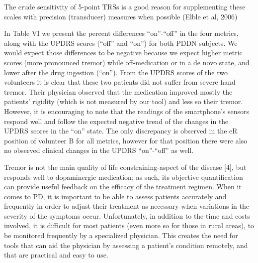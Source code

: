
The crude sensitivity of 5-point TRSs is a good reason for supplementing these scales with precision (transducer) measures when possible (Elble et al, 2006)



In Table VI we present the percent differences “on”-“off” in the four metrics, along with the UPDRS scores (“off” and “on”) for both PDDN subjects. We would expect those differences to be negative because we expect higher metric scores (more pronounced tremor) while off-medication or in a de novo state, and lower after the drug ingestion (“on”). 
From the UPDRS scores of the two volunteers it is clear that these two patients did not suffer from severe hand tremor. Their physician observed that the medication improved mostly the patients’ rigidity (which is not measured by our tool) and less so their tremor. However, it is encouraging to note that the readings of the smartphone’s sensors respond well and follow the expected negative trend of the changes in the UPDRS scores in the “on” state. The only discrepancy is observed in the eR position of volunteer B for all metrics, however for that position there were also no observed clinical changes in the UPDRS “on”-“off” as well. 



Tremor is not the main quality of life constraining-aspect of the disease [4], but responds well to dopaminergic medication; as such, its objective quantification can provide useful feedback on the efficacy of the treatment regimen. 
When it comes to PD, it is important to be able to assess patients accurately and frequently in order to adjust their treatment as necessary when variations in the severity of the symptoms occur. Unfortunately, in addition to the time and costs involved, it is difficult for most patients (even more so for those in rural areas), to be monitored frequently by a specialized physician. This creates the need for tools that can aid the physician by assessing a patient’s condition remotely, and that are practical and easy to use. 

